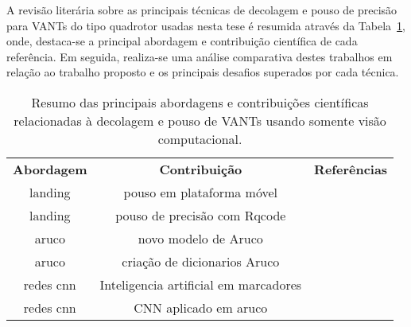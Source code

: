 	A revisão literária sobre as principais técnicas de decolagem e pouso de precisão para VANTs do tipo quadrotor usadas nesta tese é resumida através da Tabela~\ref{qd:estado-da-arte}, onde, destaca-se a principal abordagem e contribuição científica de cada referência. Em seguida, realiza-se uma análise comparativa destes trabalhos em relação ao trabalho proposto e os principais desafios superados por cada técnica.  
    \begin{table}[h]
	\caption{Resumo das principais abordagens e contribuições científicas relacionadas à decolagem e pouso de VANTs usando somente visão computacional.}
	
	\begin{center}
		\begin{tabular}{ccc}
		
			\hline
			\multirow{2}{*}{\textbf{Abordagem}} & \multirow{2}{*}{\textbf{Contribuição}} & \multirow{2}{*}{\textbf{Referências}} \\
			&                                  &                         &                      \\ \hline
			\multirow{2}{*}{landing} & \multirow{2}{*}{pouso em plataforma móvel} & \multirow{2}{*}{\citet{Forster2014}} \\
			&                                  &                         &                       \\ \hline
			\multirow{2}{*}{landing} & \multirow{2}{*}{pouso de precisão com Rqcode} & \multirow{2}{*}{\citet{Forster2014}} \\
			&                                  &                         &                       \\ \hline
			\multirow{2}{*}{aruco} & \multirow{2}{*}{novo modelo de Aruco} & \multirow{2}{*}{\citet{Forster2014}} \\
			&                                  &                         &                        \\ \hline
			\multirow{2}{*}{aruco} & \multirow{2}{*}{criação de dicionarios Aruco} & \multirow{2}{*}{\citet{Forster2014}} \\
			&                                  &                         &                         \\ \hline
			\multirow{2}{*}{redes cnn} & \multirow{2}{*}{Inteligencia artificial em marcadores} & \multirow{2}{*}{\citet{Forster2014}} \\
			&                                  &                         &                          \\ \hline
			\multirow{2}{*}{redes cnn} & \multirow{2}{*}{CNN aplicado em aruco} & \multirow{2}{*}{\citet{Forster2014}} \\
			&                                  &                         &                           \\ \hline
			
		\end{tabular}
	\end{center}
	\label{qd:estado-da-arte}
\end{table}
    
